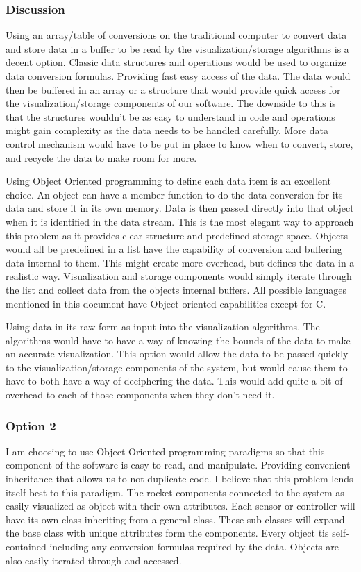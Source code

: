 \documentclass[10pt,draftclsnofoot,onecolumn]{IEEEtran}
\begin{document}
\subsubsection{Discussion}
Using an array/table of conversions on the traditional computer to convert data and store data in a buffer to be read by the visualization/storage algorithms is a decent option. Classic data structures and operations would be used to organize data conversion formulas. Providing fast easy access of the data. The data would then be buffered in an array or a structure that would provide quick access for the visualization/storage components of our software. The downside to this is that the structures wouldn't be as easy to understand in code and operations might gain complexity as the data needs to be handled carefully. More data control mechanism would have to be put in place to know when to convert, store, and recycle the data to make room for more.\par
	 Using Object Oriented programming to define each data item is an excellent choice. An object can have a member function to do the data conversion for its data and store it in its own memory. Data is then passed directly into that object when it is identified in the data stream. This is the most elegant way to approach this problem as it provides clear structure and predefined storage space. Objects would all be predefined in a list have the capability of conversion and buffering data internal to them. This might create more overhead, but defines the data in a realistic way. Visualization and storage components would simply iterate through the list and collect data from the objects internal buffers. All possible languages mentioned in this document have Object oriented capabilities except for C. \par
	 Using data in its raw form as input into the visualization algorithms. The algorithms would have to have a way of knowing the bounds of the data to make an accurate visualization. This option would allow the data to be passed quickly to the visualization/storage components of the system, but would cause them to have to both have a way of deciphering the data. This would add quite a bit of overhead to each of those components when they don't need it. \\

\subsubsection{Option 2}
I am choosing to use Object Oriented programming paradigms so that this component of the software is easy to read, and manipulate. Providing convenient inheritance that allows us to not duplicate code. I believe that this problem lends itself best to this paradigm. The rocket components connected to the system as easily visualized as object with their own attributes. Each sensor or controller will have its own class inheriting from a general class. These sub classes will expand the base class with unique attributes form the components. Every object tis self-contained including any conversion formulas required by the data. Objects are also easily iterated through and accessed. 
\end{document}
